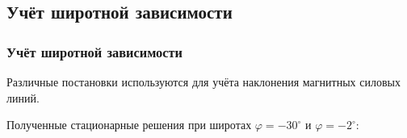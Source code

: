 \documentclass[9pt, apectratio=43,unicode]{beamer}
\begin{document}
\subsection{Учёт широтной зависимости}
\begin{frame}\frametitle{Учёт широтной зависимости}
Различные постановки используются для учёта наклонения магнитных силовых линий. 

Полученные стационарные решения при широтах $\varphi = -30^\circ$ и $\varphi=-2^\circ$:


\begin{figure}[H]
\begin{minipage}[c]{0.490\linewidth}
\flushleft
{}
\end{minipage}
\hfill
\begin{minipage}[c]{0.490\linewidth}
\flushleft
{}
\end{minipage}
\end{figure}

\end{frame}
\end{document}
